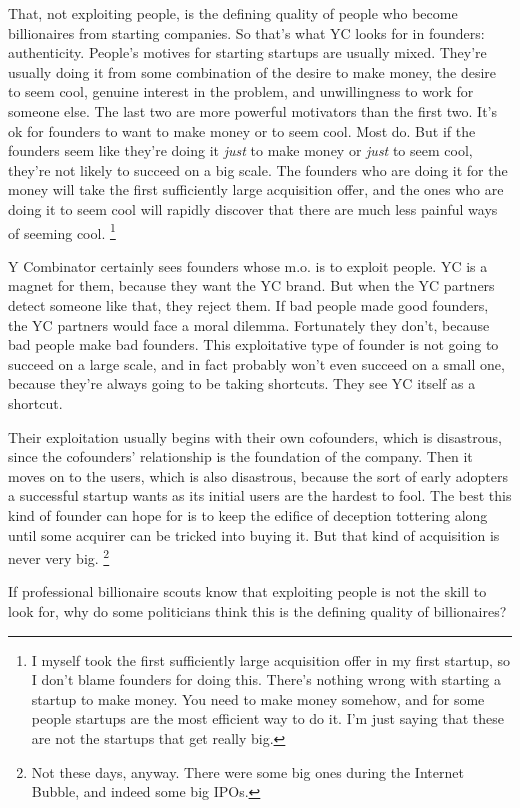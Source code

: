 \documentclass[12pt]{book}
\begin{document}
That, not exploiting people, is the defining quality of people who
become billionaires from starting companies. So that's what YC looks for
in founders: authenticity. People's motives for starting startups are
usually mixed. They're usually doing it from some combination of the
desire to make money, the desire to seem cool, genuine interest in the
problem, and unwillingness to work for someone else. The last two are
more powerful motivators than the first two. It's ok for founders to
want to make money or to seem cool. Most do. But if the founders seem
like they're doing it \emph{just} to make money or \emph{just} to seem
cool, they're not likely to succeed on a big scale. The founders who are
doing it for the money will take the first sufficiently large
acquisition offer, and the ones who are doing it to seem cool will
rapidly discover that there are much less painful ways of seeming cool.
\footnote{I myself took the first sufficiently large acquisition offer in
my first startup, so I don't blame founders for doing this. There's
nothing wrong with starting a startup to make money. You need to make
money somehow, and for some people startups are the most efficient way
to do it. I'm just saying that these are not the startups that get
really big.}

Y Combinator certainly sees founders whose m.o. is to exploit people. YC
is a magnet for them, because they want the YC brand. But when the YC
partners detect someone like that, they reject them. If bad people made
good founders, the YC partners would face a moral dilemma. Fortunately
they don't, because bad people make bad founders. This exploitative type
of founder is not going to succeed on a large scale, and in fact
probably won't even succeed on a small one, because they're always going
to be taking shortcuts. They see YC itself as a shortcut.

Their exploitation usually begins with their own cofounders, which is
disastrous, since the cofounders' relationship is the foundation of the
company. Then it moves on to the users, which is also disastrous,
because the sort of early adopters a successful startup wants as its
initial users are the hardest to fool. The best this kind of founder can
hope for is to keep the edifice of deception tottering along until some
acquirer can be tricked into buying it. But that kind of acquisition is
never very big. \footnote{Not these days, anyway. There were some big ones during the
Internet Bubble, and indeed some big IPOs.}

If professional billionaire scouts know that exploiting people is not
the skill to look for, why do some politicians think this is the
defining quality of billionaires?
\end{document}
